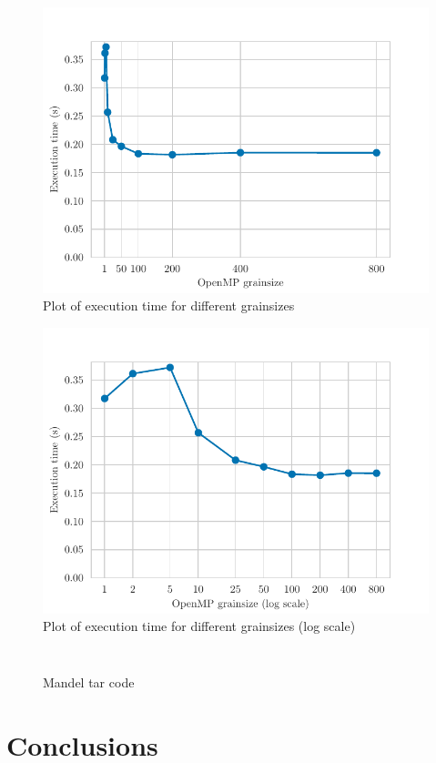 \begin{figure}[H]
    \centering
    \includegraphics{plots/grainsize.pdf}
    \caption{Plot of execution time for different grainsizes}
    \label{fig:grain} 
\end{figure}

\begin{figure}[H]
    \centering
    \includegraphics{plots/grainsize_log.pdf}
    \caption{Plot of execution time for different grainsizes (log scale)}
    \label{fig:grain_log} 
\end{figure}

\begin{figure}[H]
    \centering
    \caption{Mandel tar code}
    \inputminted[firstline=91,lastline=127]{c}{sources/mandel-tar.c}
    \vspace{-2em}
    \inputminted[firstline=200,lastline=210]{c}{sources/mandel-tar.c}
    \label{fig:grain_log} 
\end{figure}

\section{Conclusions}%
\label{sec:Conclusions}




